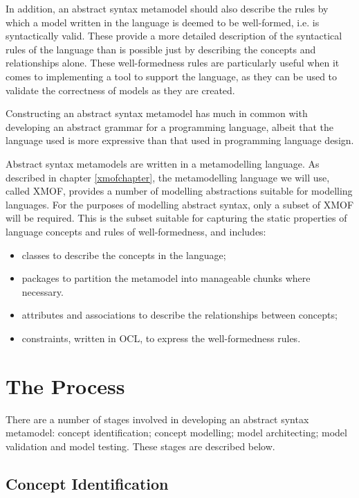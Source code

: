 In addition, an abstract syntax metamodel should also describe the rules by which a model written in the language is deemed to be well-formed, i.e. is syntactically valid. These provide a more detailed description of the syntactical rules of the language than is possible just by describing the concepts and relationships alone. These well-formedness rules are particularly useful when it comes to implementing a tool to support the language, as they can be used to validate the correctness of models as they are created.

Constructing an abstract syntax metamodel has much in common with developing an abstract grammar for a programming language, albeit that the language used is more expressive than that used in programming language design. 

Abstract syntax metamodels are written in a metamodelling language. As described in chapter \ref{xmofchapter}, the metamodelling language we will use, called XMOF, provides a number of modelling abstractions suitable for modelling languages. For the purposes of modelling abstract syntax, only a subset of XMOF will be required. This is the subset suitable for capturing the static properties of language concepts and rules of well-formedness, and includes:

\begin{itemize}
\item classes to describe the concepts in the language;
\item packages to partition the metamodel into manageable chunks where necessary.
\item attributes and associations to describe the relationships between concepts;
\item constraints, written in OCL, to express the well-formedness rules.
\end{itemize} 

\section{The Process}

There are a number of stages involved in developing an abstract syntax metamodel: concept identification; concept modelling; model architecting; model validation and model testing. These stages are described below.

\subsection{Concept Identification}
\label{conceptidentification}


